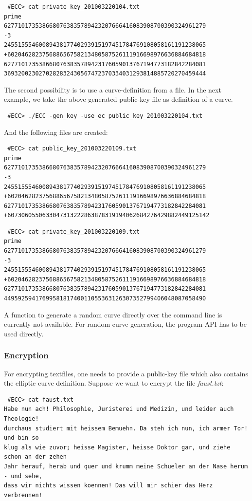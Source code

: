 \documentclass[11pt,english]{article}
\begin{document}
\begin{verbatim}
 #ECC> cat private_key_201003220104.txt
prime
6277101735386680763835789423207666416083908700390324961279
-3
2455155546008943817740293915197451784769108058161191238065
+602046282375688656758213480587526111916698976636884684818
6277101735386680763835789423176059013767194773182842284081
3693200230270282832430567472370334031293814885720270459444
\end{verbatim}

The second possibility is to use a curve-definition from a file. In the next example, we take the above generated public-key file as definition of a curve.

\begin{verbatim}
 #ECC> ./ECC -gen_key -use_ec public_key_201003220104.txt
\end{verbatim}

And the following files are created:

\begin{verbatim}
 #ECC> cat public_key_201003220109.txt
prime
6277101735386680763835789423207666416083908700390324961279
-3
2455155546008943817740293915197451784769108058161191238065
+602046282375688656758213480587526111916698976636884684818
6277101735386680763835789423176059013767194773182842284081
+6073060550633047313222863878319194062684276429882449125142
\end{verbatim}
\begin{verbatim}
 #ECC> cat private_key_201003220109.txt
prime
6277101735386680763835789423207666416083908700390324961279
-3
2455155546008943817740293915197451784769108058161191238065
+602046282375688656758213480587526111916698976636884684818
6277101735386680763835789423176059013767194773182842284081
4495925941769958181740011055363126307352799406048087058490
\end{verbatim}

A function to generate a random curve directly over the command line is currently not available. For random curve generation, the program API has to be used directly.

\subsubsection{Encryption}
For encrypting textfiles, one needs to provide a public-key file which also contains the elliptic curve definition. Suppose we want to encrypt the file \emph{faust.txt}:

\begin{verbatim}
 #ECC> cat faust.txt
Habe nun ach! Philosophie, Juristerei und Medizin, und leider auch Theologie!
durchaus studiert mit heissem Bemuehn. Da steh ich nun, ich armer Tor! und bin so
klug als wie zuvor; heisse Magister, heisse Doktor gar, und ziehe schon an der zehen
Jahr herauf, herab und quer und krumm meine Schueler an der Nase herum - und sehe,
dass wir nichts wissen koennen! Das will mir schier das Herz verbrennen!
\end{verbatim}
\end{document}
